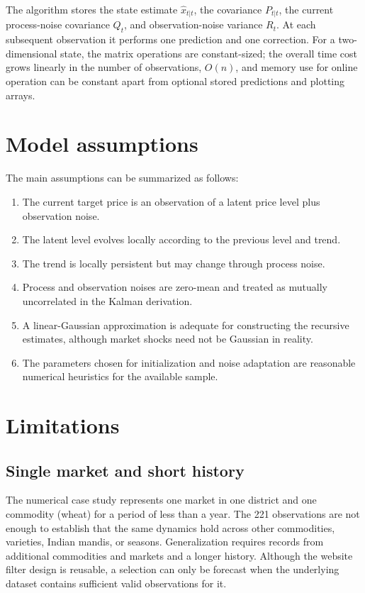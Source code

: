 \documentclass[12pt,a4paper,oneside]{report}
\numberwithin{equation}{chapter}
\numberwithin{figure}{chapter}
\numberwithin{table}{chapter}
\theoremstyle{definition}
\theoremstyle{plain}
\newcommand{\1}{\mathbf{1}}
\newcommand{\hatt}[1]{\widehat{#1}}
\begin{document}
The algorithm stores the state estimate $\hatt{x}_{t|t}$, the covariance $P_{t|t}$, the current process-noise covariance $Q_t$, and observation-noise variance $R_t$. At each subsequent observation it performs one prediction and one correction. For a two-dimensional state, the matrix operations are constant-sized; the overall time cost grows linearly in the number of observations, $O(n)$, and memory use for online operation can be constant apart from optional stored predictions and plotting arrays.

\section{Model assumptions}
The main assumptions can be summarized as follows:
\begin{enumerate}
  \item The current target price is an observation of a latent price level plus observation noise.
  \item The latent level evolves locally according to the previous level and trend.
  \item The trend is locally persistent but may change through process noise.
  \item Process and observation noises are zero-mean and treated as mutually uncorrelated in the Kalman derivation.
  \item A linear-Gaussian approximation is adequate for constructing the recursive estimates, although market shocks need not be Gaussian in reality.
  \item The parameters chosen for initialization and noise adaptation are reasonable numerical heuristics for the available sample.
\end{enumerate}

\section{Limitations}
\subsection{Single market and short history}
The numerical case study represents one market in one district and one commodity (wheat) for a period of less than a year. The 221 observations are not enough to establish that the same dynamics hold across other commodities, varieties, Indian mandis, or seasons. Generalization requires records from additional commodities and markets and a longer history. Although the website filter design is reusable, a selection can only be forecast when the underlying dataset contains sufficient valid observations for it.
\end{document}
